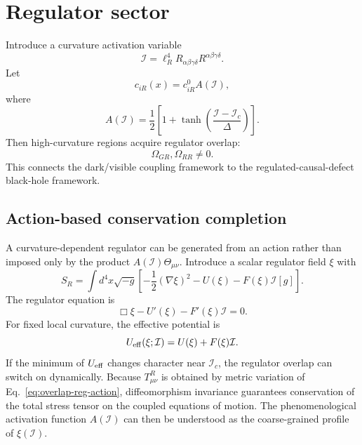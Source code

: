 \documentclass[11pt]{article}
\theoremstyle{remark}
\begin{document}
\section{Regulator sector}
Introduce a curvature activation variable
\begin{equation}
    \mathcal I=\ell_R^4 R_{\alpha\beta\gamma\delta}R^{\alpha\beta\gamma\delta}.
\end{equation}
Let
\begin{equation}
    c_{iR}(x)=c_{iR}^{0}A(\mathcal I),
\end{equation}
where
\begin{equation}
    A(\mathcal I)=\frac{1}{2}\left[1+\tanh\left(\frac{\mathcal I-\mathcal I_c}{\Delta}\right)\right].
\end{equation}
Then high-curvature regions acquire regulator overlap:
\begin{equation}
    \Omega_{GR},\Omega_{RR}\neq 0.
\end{equation}
This connects the dark/visible coupling framework to the regulated-causal-defect black-hole framework.


\subsection{Action-based conservation completion}
A curvature-dependent regulator can be generated from an action rather than imposed only by the product $A(\mathcal I)\Theta_{\mu\nu}$. Introduce a scalar regulator field $\xi$ with
\begin{equation}
 S_R=\int d^4x\sqrt{-g}
 \left[-\frac12(\nabla\xi)^2-U(\xi)-F(\xi)\mathcal I[g]\right].
 \label{eq:overlap-reg-action}
\end{equation}
The regulator equation is
\begin{equation}
 \Box\xi-U'(\xi)-F'(\xi)\mathcal I=0.
 \label{eq:overlap-reg-eom}
\end{equation}
For fixed local curvature, the effective potential is
\begin{equation}
 U_{\rm eff}(\xi;\mathcal I)=U(\xi)+F(\xi)\mathcal I.
\end{equation}
If the minimum of $U_{\rm eff}$ changes character near $\mathcal I_c$, the regulator overlap can switch on dynamically. Because $T^{R}_{\mu\nu}$ is obtained by metric variation of Eq.~\eqref{eq:overlap-reg-action}, diffeomorphism invariance guarantees conservation of the total stress tensor on the coupled equations of motion. The phenomenological activation function $A(\mathcal I)$ can then be understood as the coarse-grained profile of $\xi(\mathcal I)$.
\end{document}
